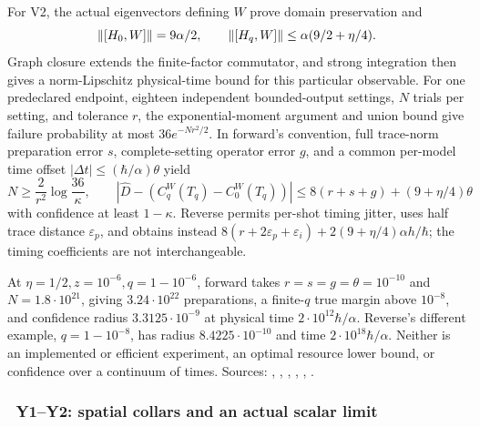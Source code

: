For V2, the actual eigenvectors defining $W$ prove domain preservation and
\begin{equation}
 \left\lVert [H_0,W]\right\rVert=9\alpha/2,\qquad
 \left\lVert [H_q,W]\right\rVert\le\alpha(9/2+\eta/4).
 \label{recent:clock-commutator}
\end{equation}
Graph closure extends the finite-factor commutator, and strong integration
then gives a norm-Lipschitz physical-time bound for this particular observable.
For one predeclared endpoint, eighteen independent bounded-output settings,
$N$ trials per setting, and tolerance $r$, the exponential-moment argument and
union bound give failure probability at most $36e^{-Nr^2/2}$.
In forward's convention, full trace-norm preparation error $s$, complete-setting
operator error $g$, and a common per-model time offset
$|\Delta t|\le(\hbar/\alpha)\theta$ yield
\begin{equation}
 N\ge\frac2{r^2}\log\frac{36}{\kappa},\qquad
 |\widehat D-(C_q^W(T_q)-C_0^W(T_q))|
 \le8(r+s+g)+(9+\eta/4)\theta
 \label{recent:readout-budget}
\end{equation}
with confidence at least $1-\kappa$.  Reverse permits per-shot timing jitter,
uses half trace distance $\varepsilon_p$, and obtains instead
$8(r+2\varepsilon_p+\varepsilon_i)
+2(9+\eta/4)\alpha h/\hbar$; the timing coefficients are not interchangeable.

At $\eta=1/2,z=10^{-6},q=1-10^{-6}$, forward takes
$r=s=g=\theta=10^{-10}$ and $N=1.8\cdot10^{21}$, giving $3.24\cdot10^{22}$
preparations, a finite-$q$ true margin above $10^{-8}$, and confidence radius
$3.3125\cdot10^{-9}$ at physical time $2\cdot10^{12}\hbar/\alpha$.
Reverse's different example, $q=1-10^{-8}$, has radius $8.4225\cdot10^{-10}$
and time $2\cdot10^{18}\hbar/\alpha$.  Neither is an implemented or efficient
experiment, an optimal resource lower bound, or confidence over a continuum of
times.  Sources: ,
,
,
,
,
.

\subsubsection{\workstar\ Y1--Y2: spatial collars and an actual scalar limit}


